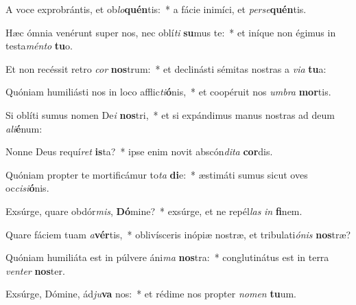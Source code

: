 \item A voce exprobrántis, et ob\textit{lo}\textbf{quén}tis:~* a fácie inimíci, et \textit{per}\textit{se}\textbf{quén}tis.
\item Hæc ómnia venérunt super nos, nec oblí\textit{ti} \textbf{su}mus te:~* et iníque non égimus in testa\textit{mén}\textit{to} \textbf{tu}o.
\item Et non recéssit retro \textit{cor} \textbf{nos}trum:~* et declinásti sémitas nostras a \textit{vi}\textit{a} \textbf{tu}a:
\item Quóniam humiliásti nos in loco afflic\textit{ti}\textbf{ó}nis,~* et coopéruit nos \textit{um}\textit{bra} \textbf{mor}tis.
\item Si oblíti sumus nomen De\textit{i} \textbf{nos}tri,~* et si expándimus manus nostras ad deum \textit{a}\textit{li}\textbf{é}num:
\item Nonne Deus requí\textit{ret} \textbf{is}ta?~* ipse enim novit abscón\textit{di}\textit{ta} \textbf{cor}dis.
\item Quóniam propter te mortificámur to\textit{ta} \textbf{di}e:~* æstimáti sumus sicut oves oc\textit{ci}\textit{si}\textbf{ó}nis.
\item Exsúrge, quare obdór\textit{mis}, \textbf{Dó}mine?~* exsúrge, et ne repél\textit{las} \textit{in} \textbf{fi}nem.
\item Quare fáciem tuam \textit{a}\textbf{vér}tis,~* oblivísceris inópiæ nostræ, et tribulati\textit{ó}\textit{nis} \textbf{nos}træ?
\item Quóniam humiliáta est in púlvere áni\textit{ma} \textbf{nos}tra:~* conglutinátus est in terra \textit{ven}\textit{ter} \textbf{nos}ter.
\item Exsúrge, Dómine, ád\textit{ju}\textbf{va} nos:~* et rédime nos propter \textit{no}\textit{men} \textbf{tu}um.

